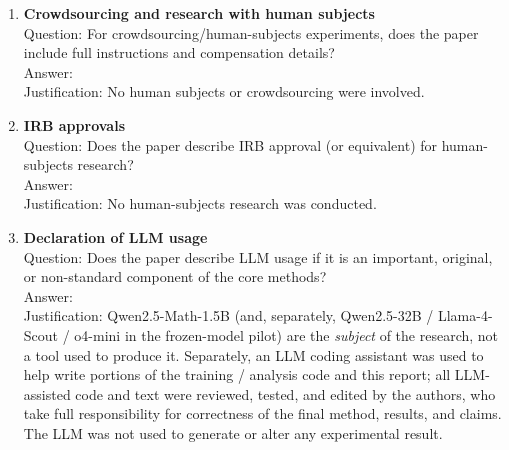 \documentclass{article}
\begin{document}
\begin{enumerate}
\item \textbf{Crowdsourcing and research with human subjects}\\
    Question: For crowdsourcing/human-subjects experiments, does the paper
    include full instructions and compensation details?\\
    Answer: \answerNA{}\\
    Justification: No human subjects or crowdsourcing were involved.

\item \textbf{IRB approvals}\\
    Question: Does the paper describe IRB approval (or equivalent) for
    human-subjects research?\\
    Answer: \answerNA{}\\
    Justification: No human-subjects research was conducted.

\item \textbf{Declaration of LLM usage}\\
    Question: Does the paper describe LLM usage if it is an important,
    original, or non-standard component of the core methods?\\
    Answer: \answerYes{}\\
    Justification: Qwen2.5-Math-1.5B (and, separately, Qwen2.5-32B /
    Llama-4-Scout / o4-mini in the frozen-model pilot) are the
    \emph{subject} of the research, not a tool used to produce it. Separately,
    an LLM coding assistant was used to help write portions of the training
    / analysis code and this report; all LLM-assisted code and text were
    reviewed, tested, and edited by the authors, who take full
    responsibility for correctness of the final method, results, and
    claims. The LLM was not used to generate or alter any experimental
result.

\end{enumerate}
\end{document}
